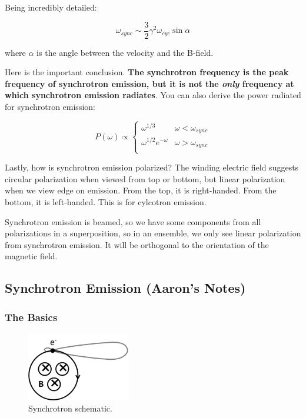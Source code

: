 \documentclass{article}
\begin{document}
Being incredibly detailed:

$$
\omega_{sync} \sim \frac32 \gamma^2 \omega_{cyc} \sin\alpha
$$

where $\alpha$ is the angle between the velocity and the B-field. 

Here is the important conclusion. \textbf{The synchrotron frequency is the peak frequency of synchrotron emission, but it is not the \textit{only} frequency at which synchrotron emission radiates}. You can also derive the power radiated for synchrotron emission:

\[ P(\omega) \propto \begin{cases} 
      \omega^{1/3} & \omega < \omega_{sync} \\
      \omega^{1/2} e^{-\omega} & \omega > \omega_{sync} \\
   \end{cases}
\]

Lastly, how is synchrotron emission polarized? The winding electric field suggests circular polarization when viewed from top or bottom, but linear polarization when we view edge on emission. From the top, it is right-handed. From the bottom, it is left-handed. This is for cylcotron emission. 

Synchrotron emission is beamed, so we have some components from all polarizations in a superposition, so in an ensemble, we only see linear polarization from synchrotron emission. It will be orthogonal to the orientation of the magnetic field. 

\subsection{Synchrotron Emission (Aaron's Notes)}

\subsubsection{The Basics}

\begin{figure}
    \centering
    \includegraphics[width=0.4\textwidth]{figures/300px-Synchrotron.png}
    \caption{Synchrotron schematic.}
    \label{fig:synscehm}
\end{figure}
\end{document}
